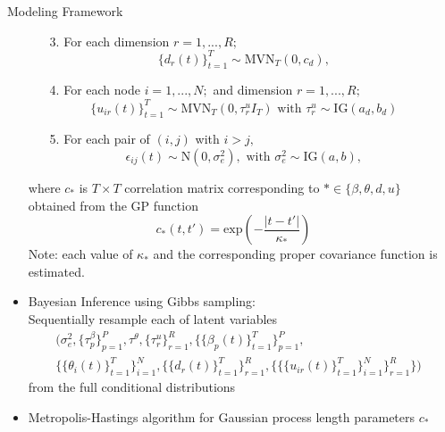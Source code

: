 \documentclass[serif,mathserif,final,table]{beamer}
\begin{document}
\begin{frame}{}
\begin{columns}[t]
\begin{column}{0.235\linewidth}
\begin{block}{Modeling Framework}
\begin{itemize}
\begin{enumerate}
         	\item[3.] For each dimension $r=1,...,R;$
         	 $$\{d_{r}(t)\}_{t=1}^T  \sim \mbox{MVN}_{T}(0, c_d), $$
         	\item[4.] For each node $i=1,...,N;$ and dimension $r=1,...,R;$ 
         	$$\{u_{ir}(t)\}_{t=1}^T \sim \mbox{MVN}_{T}(0, \tau^{u}_rI_T) \mbox{ with } \tau^{u}_r\sim \mbox{IG}(a_d, b_d)$$
         	\item[5.] For each pair of $(i, j)$ with $i > j,$
         	$$\epsilon_{ij}(t) \sim \mbox{N}(0, \sigma_e^2), \mbox{ with } \sigma_e^2 \sim \mbox{IG}(a, b),$$
            \end{enumerate}
            where $c_*$ is $T \times T$ correlation matrix corresponding to $* \in \{\beta, \theta, d, u\}$ obtained from the GP function 
            \begin{equation*}
c_*(t, t')=
\mbox{exp}(-\frac{|t-t'|}{\kappa_*})
            \end{equation*}
            Note: each value of $\kappa_*$ and the corresponding proper covariance function is estimated. 
                        \vspace{5pt}
                        \item Bayesian Inference using Gibbs sampling:\\
                        Sequentially resample each of latent variables
                        \begin{equation*}
                        \begin{aligned}
                      	&\Big(\sigma_e^2, \{\tau^{\beta}_p\}_{p=1}^P, \tau^{\theta}, \{\tau^{u}_r\}_{r=1}^R, \{\{\beta_{p}(t)\}_{t=1}^T\}_{p=1}^P, \\& \{\{\theta_{i}(t)\}_{t=1}^T\}_{i=1}^N, \{\{d_{r}(t)\}_{t=1}^T \}_{r=1}^R, \{\{\{u_{ir}(t)\}_{t=1}^T\}_{i=1}^N\}_{r=1}^R\}\Big)
                        \end{aligned}                        
\end{equation*}
                        from the full conditional distributions
                        \item Metropolis-Hastings algorithm for Gaussian process length parameters $c_*$
        \end{itemize}
            \end{block}
     

    \end{column}

    \begin{column}{0.235\linewidth}
    	

\end{column}
\end{columns}
\end{frame}
\end{document}
